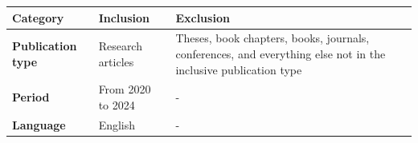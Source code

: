 \begin{table}
	{
	\begin{tabular}{p{1.5cm}p{2.2cm}p{3.9cm}} \toprule
		\textbf{Category}         & \textbf{Inclusion} & \textbf{Exclusion}                                                                                             \\
		\midrule
		\textbf{Publication type} & Research articles  & Theses, book chapters, books, journals, conferences, and everything else not in the inclusive publication type \\
		\textbf{Period}           & From 2020 to 2024  & -                                                                                                              \\
		\textbf{Language}         & English            & -                                                                                                              \\
		\bottomrule
	\end{tabular}}
	\label{table:inclusion_exclusion_criteria}
\end{table}
